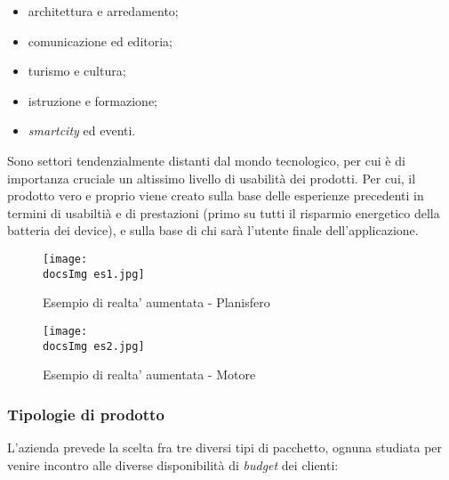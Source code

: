 \begin{itemize}
	\item architettura e arredamento;
	\item comunicazione ed editoria;
	\item turismo e cultura;
	\item istruzione e formazione;
	\item \textit{smartcity} ed eventi.
\end{itemize}
\noindent
Sono settori tendenzialmente distanti dal mondo tecnologico, per cui \`e di importanza cruciale un altissimo livello di usabilit\`a dei prodotti. Per cui, il prodotto vero e proprio viene creato sulla base delle esperienze precedenti in termini di usabilti\`a e di prestazioni (primo su tutti il risparmio energetico della batteria dei device), e sulla base di chi sar\`a l'utente finale dell'applicazione.

\begin{figure}[H]
	\centering
	\texttt{[image: \\docsImg es1.jpg]}
	\caption{Esempio di realta' aumentata - Planisfero}
	\label{fig:Esempio di realta' aumentata presente nell'app Experenti - Planisfero}
\end{figure}

\begin{figure}[H]
	\centering
	\texttt{[image: \\docsImg es2.jpg]}
	\caption{Esempio di realta' aumentata - Motore}
	\label{fig:Esempio di realta' aumentata presente nell'app Experenti - Motore}
\end{figure}


\subsubsection{Tipologie di prodotto}
L'azienda prevede la scelta fra tre diversi tipi di pacchetto, ognuna studiata per venire incontro alle diverse disponibilit\`a di \textit{budget} dei clienti:

